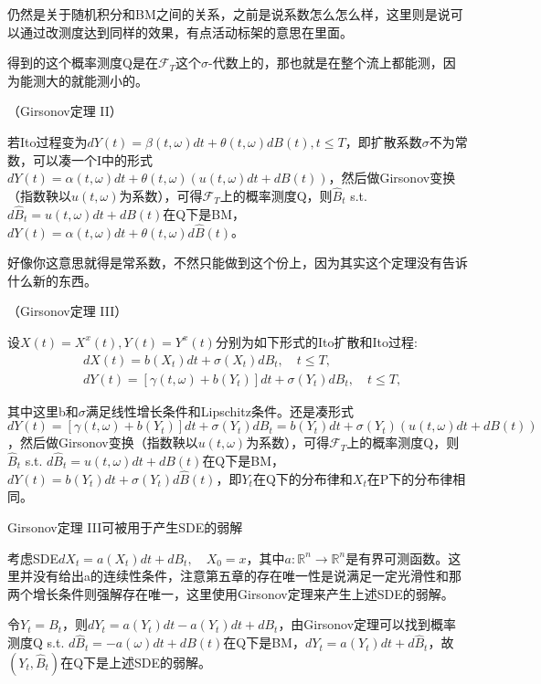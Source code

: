 仍然是关于随机积分和BM之间的关系，之前是说系数怎么怎么样，这里则是说可以通过改测度达到同样的效果，有点活动标架的意思在里面。

得到的这个概率测度Q是在$\mathcal{F}_T$这个$\sigma$-代数上的，那也就是在整个流上都能测，因为能测大的就能测小的。

\begin{thm}（Girsonov定理 II）

  若Ito过程变为$d Y(t)=\beta(t, \omega) d t+\theta(t, \omega) d B(t), t \leq T$，即扩散系数$\sigma$不为常数，可以凑一个I中的形式$d Y(t)=\alpha(t, \omega) d t+\theta(t, \omega)(u(t, \omega)dt + d B(t))$，然后做Girsonov变换（指数鞅以$u(t, \omega)$为系数），可得$\mathcal{F}_T$上的概率测度Q，则$\widehat{B}_t$ s.t. $d\widehat{B}_t = u(t, \omega)dt + d B(t)$在Q下是BM，$d Y(t)=\alpha(t, \omega) d t+\theta(t, \omega) d \widehat{B}(t)$。
\end{thm}

好像你这意思就得是常系数，不然只能做到这个份上，因为其实这个定理没有告诉什么新的东西。

\begin{thm}（Girsonov定理 III）

  设$X(t)=X^{x}(t), Y(t)=Y^{x}(t)$分别为如下形式的Ito扩散和Ito过程:
  \[
    \begin{aligned}
      &d X(t)=b\left(X_{t}\right) d t+\sigma\left(X_{t}\right) d B_{t}, \quad t \leq T, \\
      &d Y(t)=\left[\gamma(t, \omega)+b\left(Y_{t}\right)\right] d t+\sigma\left(Y_{t}\right) d B_{t}, \quad t \leq T,
    \end{aligned}
  \]

  其中这里b和$\sigma$满足线性增长条件和Lipschitz条件。还是凑形式$d Y(t)=\left[\gamma(t, \omega)+b\left(Y_{t}\right)\right] d t+\sigma\left(Y_{t}\right) d B_{t} = b(Y_t) d t+\sigma(Y_t)(u(t, \omega)dt + d B(t))$，然后做Girsonov变换（指数鞅以$u(t, \omega)$为系数），可得$\mathcal{F}_T$上的概率测度Q，则$\widehat{B}_t$ s.t. $d\widehat{B}_t = u(t, \omega)dt + d B(t)$在Q下是BM，$d Y(t)=b(Y_t) d t+\sigma(Y_t) d \widehat{B}(t)$，即$Y_t$在Q下的分布律和$X_t$在P下的分布律相同。
\end{thm}

Girsonov定理 III可被用于产生SDE的弱解

\begin{eg}
  考虑SDE$d X_{t}=a\left(X_{t}\right) d t+d B_{t}, \quad X_{0}=x$，其中$a: \mathbb{R}^n \to \mathbb{R}^n$是有界可测函数。这里并没有给出a的连续性条件，注意第五章的存在唯一性是说满足一定光滑性和那两个增长条件则强解存在唯一，这里使用Girsonov定理来产生上述SDE的弱解。

  令$Y_t = B_t$，则$dY_t = a(Y_t) dt - a(Y_t) dt + dB_t$，由Girsonov定理可以找到概率测度Q s.t. $d\widehat{B}_t =  - a(\omega)dt + d B(t)$在Q下是BM，$dY_t = a(Y_t) dt + d\widehat{B}_t$，故$(Y_t, \widehat{B}_t)$在Q下是上述SDE的弱解。
\end{eg}


